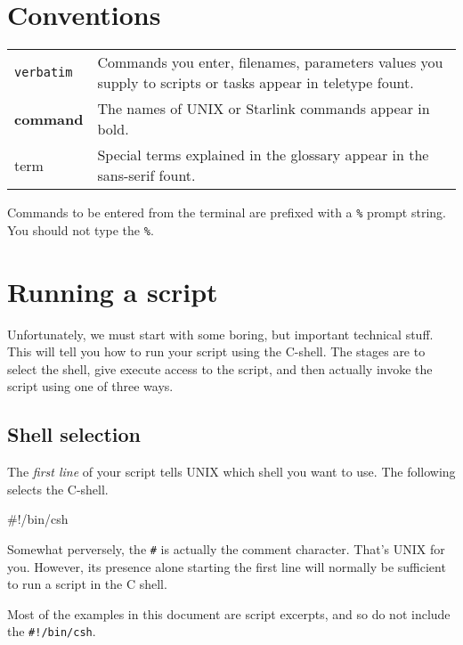 \documentclass[twoside,11pt,nolof]{starlink}
\begin{document}
\section{Conventions}
\begin{tabular}{lp{120mm}}
\texttt{verbatim}   &  Commands you enter, filenames, parameters values
                    you supply to scripts or tasks appear in teletype
                    fount. \\
\textbf{command}    &  The names of UNIX or Starlink commands appear
                    in bold. \\
\textsf{term}       &  Special terms explained in the glossary appear
                    in the sans-serif fount. \\
\end{tabular}

Commands to be entered from the terminal are prefixed with a \texttt{\%}
prompt string.  You should not type the \texttt{\%}.

\newpage
\section{Running a script\label{sc4_se_running}}

Unfortunately, we must start with some boring, but important technical
stuff.  This will tell you how to run your script using the C-shell.  The
stages are to select the shell, give execute access to the script, and
then actually invoke the script using one of three ways.

\subsection{Shell selection\label{sc4_se_cshselect}}

The \emph{first line\/} of your script tells UNIX which shell you want
to use.  The following selects the C-shell.

\begin{small}
\begin{terminalv}
     #!/bin/csh
\end{terminalv}
\end{small}
Somewhat perversely, the \texttt{\#} is actually the comment character.
That's UNIX for you.  However, its presence alone starting the first
line will normally be sufficient to run a script in the C shell.

Most of the examples in this document are script excerpts, and so do not
include the \mbox{\texttt{\#!/bin/csh}}.
\end{document}
